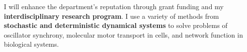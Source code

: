 I will enhance the department's reputation through grant funding and my \textbf{interdisciplinary research program}. I use a variety of methods from \textbf{stochastic and deterministic dynamical systems} to solve problems of oscillator synchrony, molecular motor transport in cells, and network function in biological systems.

